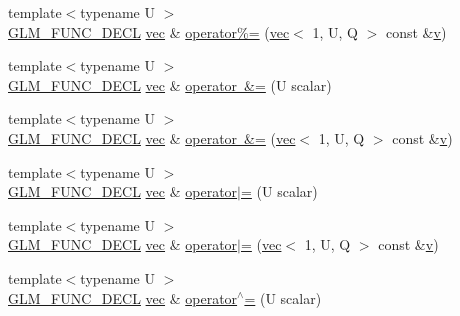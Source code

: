 \begin{DoxyCompactItemize}
{\footnotesize template$<$typename U $>$ }\\\mbox{\hyperlink{setup_8hpp_ab2d052de21a70539923e9bcbf6e83a51}{G\+L\+M\+\_\+\+F\+U\+N\+C\+\_\+\+D\+E\+CL}} \mbox{\hyperlink{structglm_1_1vec}{vec}} \& \mbox{\hyperlink{structglm_1_1vec_3_011_00_01_t_00_01_q_01_4_a9eb9bdb0ae02f791df5f5f5e50106a37}{operator\%=}} (\mbox{\hyperlink{structglm_1_1vec}{vec}}$<$ 1, U, Q $>$ const \&\mbox{\hyperlink{_s_d_l__opengl_8h_a10a82eabcb59d2fcd74acee063775f90}{v}})
\item 
{\footnotesize template$<$typename U $>$ }\\\mbox{\hyperlink{setup_8hpp_ab2d052de21a70539923e9bcbf6e83a51}{G\+L\+M\+\_\+\+F\+U\+N\+C\+\_\+\+D\+E\+CL}} \mbox{\hyperlink{structglm_1_1vec}{vec}} \& \mbox{\hyperlink{structglm_1_1vec_3_011_00_01_t_00_01_q_01_4_a706c89cad56f524dcb0f28ffd4331e47}{operator \&=}} (U scalar)
\item 
{\footnotesize template$<$typename U $>$ }\\\mbox{\hyperlink{setup_8hpp_ab2d052de21a70539923e9bcbf6e83a51}{G\+L\+M\+\_\+\+F\+U\+N\+C\+\_\+\+D\+E\+CL}} \mbox{\hyperlink{structglm_1_1vec}{vec}} \& \mbox{\hyperlink{structglm_1_1vec_3_011_00_01_t_00_01_q_01_4_a8c0b58226b01a0755fa54aab4ccfe274}{operator \&=}} (\mbox{\hyperlink{structglm_1_1vec}{vec}}$<$ 1, U, Q $>$ const \&\mbox{\hyperlink{_s_d_l__opengl_8h_a10a82eabcb59d2fcd74acee063775f90}{v}})
\item 
{\footnotesize template$<$typename U $>$ }\\\mbox{\hyperlink{setup_8hpp_ab2d052de21a70539923e9bcbf6e83a51}{G\+L\+M\+\_\+\+F\+U\+N\+C\+\_\+\+D\+E\+CL}} \mbox{\hyperlink{structglm_1_1vec}{vec}} \& \mbox{\hyperlink{structglm_1_1vec_3_011_00_01_t_00_01_q_01_4_a4461fe7917c4bf548c2cc8f0e331fa4d}{operator$\vert$=}} (U scalar)
\item 
{\footnotesize template$<$typename U $>$ }\\\mbox{\hyperlink{setup_8hpp_ab2d052de21a70539923e9bcbf6e83a51}{G\+L\+M\+\_\+\+F\+U\+N\+C\+\_\+\+D\+E\+CL}} \mbox{\hyperlink{structglm_1_1vec}{vec}} \& \mbox{\hyperlink{structglm_1_1vec_3_011_00_01_t_00_01_q_01_4_ab4a630f41cedd0b2e443326231a53dd3}{operator$\vert$=}} (\mbox{\hyperlink{structglm_1_1vec}{vec}}$<$ 1, U, Q $>$ const \&\mbox{\hyperlink{_s_d_l__opengl_8h_a10a82eabcb59d2fcd74acee063775f90}{v}})
\item 
{\footnotesize template$<$typename U $>$ }\\\mbox{\hyperlink{setup_8hpp_ab2d052de21a70539923e9bcbf6e83a51}{G\+L\+M\+\_\+\+F\+U\+N\+C\+\_\+\+D\+E\+CL}} \mbox{\hyperlink{structglm_1_1vec}{vec}} \& \mbox{\hyperlink{structglm_1_1vec_3_011_00_01_t_00_01_q_01_4_adc1d8c73a25f303593984181492ca504}{operator$^\wedge$=}} (U scalar)

\end{DoxyCompactItemize}
